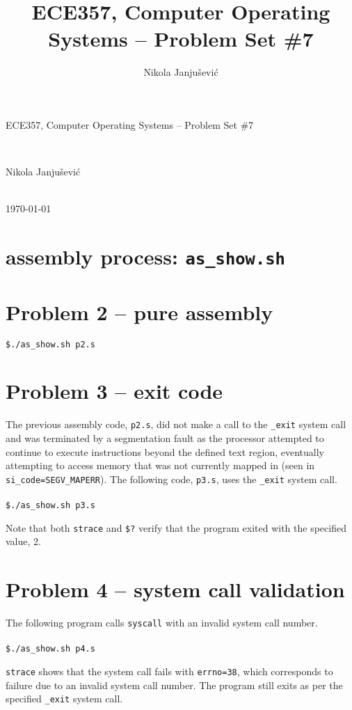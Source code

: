 \documentclass[11pt,a4paper]{article}
\author{Nikola Janju\v{s}evi\'{c}}
\title{ECE357, Computer Operating Systems -- Problem Set \#7}
\begin{document}
\begin{Large}
ECE357, Computer Operating Systems -- Problem Set \#7
\end{Large} \\
\begin{large}
Nikola Janju\v{s}evi\'{c}
\end{large} 
\\
\today

\section*{assembly process: \texttt{as\_show.sh}}


\section*{Problem 2 -- pure assembly}
\verb!$./as_show.sh p2.s!


\pagebreak

\section*{Problem 3 -- exit code}
The previous assembly code, \verb!p2.s!, did not make a call to the \verb!_exit! system call and was terminated by a segmentation fault as the processor attempted to continue to execute instructions beyond the defined text region, eventually attempting to access memory that was not currently mapped in (seen in \verb!si_code=SEGV_MAPERR!). The following code, \verb!p3.s!, uses the \verb!_exit! system call. \\\\
\verb!$./as_show.sh p3.s!

Note that both \verb!strace! and \verb!$?! verify that the program exited with the specified value, 2.

\section*{Problem 4 -- system call validation}
The following program calls \verb!syscall! with an invalid system call number. \\\\
\verb!$./as_show.sh p4.s!

\verb!strace! shows that the system call fails with \verb!errno=38!, which corresponds to failure due to an invalid system call number. The program still exits as per the specified \verb!_exit! system call.
\end{document}
